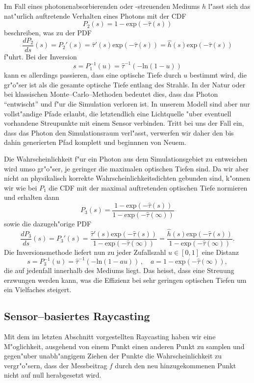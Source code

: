 	Im Fall eines photonenabsorbierenden oder -streuenden Mediums $h$ l"asst sich das nat"urlich auftretende Verhalten eines Photons mit der CDF
	$$P_2(s)=1-\text{exp}(-{\hat \tau}(s))$$
	beschreiben, was zu der PDF
	$$\frac{dP_2}{ds}(s)=P_2'(s)={\hat \tau}'(s)\text{exp}(-{\hat \tau}(s))={\hat h}(s)\text{exp}(-{\hat \tau}(s))$$
	f"uhrt. Bei der Inversion
	$$s=P_1^{-1}(u)={\hat \tau}^{-1}\left(-\text{ln}(1-u)\right)$$
	kann es allerdings passieren, dass eine optische Tiefe durch $u$ bestimmt wird, die gr"o"ser ist als die gesamte optische Tiefe entlang des Strahls. In der Natur oder bei klassischen Monte--Carlo--Methoden bedeutet dies, dass das Photon ``entwischt'' und f"ur die Simulation verloren ist. In unserem Modell sind aber nur vollst"andige Pfade erlaubt, die letztendlich eine Lichtquelle "uber eventuell vorhandene Streupunkte mit einem Sensor verbinden. Tritt bei uns der Fall ein, dass das Photon den Simulationsraum verl"asst, verwerfen wir daher den bis dahin generierten Pfad komplett und beginnnen von Neuem.
	
	Die Wahrscheinlichkeit f"ur ein Photon aus dem Simulationsgebiet zu entweichen wird umso gr"o"ser, je geringer die maximalen optischen Tiefen sind. Da wir aber nicht an physikalisch korrekte Wahrscheinlichkeitsdichten gebunden sind, k"onnen wir wie bei $P_1$ die CDF mit der maximal auftretenden optischen Tiefe normieren und erhalten dann
	$$P_3(s)=\frac{1-\text{exp}(-{\hat \tau}(s))}{1-\text{exp}(-{\hat \tau}(\infty))}$$
	sowie die dazugeh"orige PDF
	$$\frac{dP_3}{ds}(s)=P_3'(s)=\frac{{\hat \tau}'(s)\text{exp}(-{\hat \tau}(s))}{1-\text{exp}(-{\hat \tau}(\infty))}=\frac{{\hat h}(s)\text{exp}(-{\hat \tau}(s))}{1-\text{exp}(-{\hat \tau}(\infty))}.$$
	Die Inversionsmethode liefert nun zu jeder Zufallszahl $u\in[0,1]$ eine Distanz
	$$s=P_3^{-1}(u)={\hat \tau}^{-1}\left(-\text{ln}(1-a u)\right)\,,\quad a=1-\text{exp}(-{\hat \tau}(\infty)),$$
	die auf jedenfall innerhalb des Mediums liegt. Das heisst, dass eine Streuung erzwungen werden kann, was die Effizienz bei sehr geringen optischen Tiefen um ein Vielfaches steigert.
	
	\subsection{Sensor--basiertes Raycasting}\label{subsec:sensor_based_raycasting}
	Mit dem im letzten Abschnitt vorgestellten Raycasting haben wir eine M"oglichkeit, ausgehend von einem Punkt einen anderen Punkt zu samplen und gegen"uber unabh"angigem Ziehen der Punkte die Wahrscheinlichkeit zu vergr"o"sern, dass der Messbeitrag $f$ durch den neu hinzugekommenen Punkt nicht auf null herabgesetzt wird.
	
